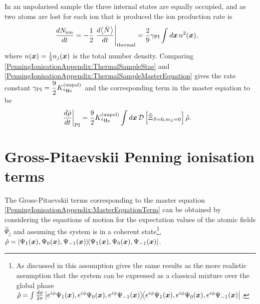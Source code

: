 In an unpolarised sample the three internal states are equally occupied, and as two atoms are lost for each ion that is produced the ion production rate is
\begin{align}
    \frac{d N_\text{ion}}{dt} &= -\frac{1}{2} \left.\frac{d \mean{\hat{N}}}{dt}\right|_\text{thermal} = \frac{2}{9} \gamma_\text{PI} \int d \vect{x}\, n^2(\vect{x}),
    \label{PenningIonisationAppendix:ThermalSampleMasterEquation}
\end{align}
where $n(\bm{x}) = \frac{1}{3}n_j(\bm{x})$ is the total number density.
Comparing \eqref{PenningIonisationAppendix:ThermalSampleStas} and \eqref{PenningIonisationAppendix:ThermalSampleMasterEquation}  gives the rate constant $\displaystyle\gamma_\text{PI} = \frac{9}{2} K^\text{(unpol)}_{^4\text{He}}$ and the corresponding term in the master equation to be
\begin{align}
    \label{PenningIonisationAppendix:MasterEquationTerm}
    \left.\frac{d \hat{\rho}}{dt}\right|_\text{PI} &= \frac{9}{2} \Kunpol \int d \vect{x}\, \mathcal{D}\left[ \hat{\Xi}_{S=0, m_S=0}\right] \hat{\rho}.
\end{align}

\section{Gross-Pitaevskii Penning ionisation terms}
\label{PenningIonisationAppendix:GP}

The Gross-Pitaevskii terms corresponding to the master equation \eqref{PenningIonisationAppendix:MasterEquationTerm} can be obtained by considering the equations of motion for the expectation values of the atomic fields $\hat{\Psi}_j$ and assuming the system is in a coherent state\footnote{As discussed in  this assumption gives the same results as the more realistic assumption that the system can be expressed as a classical mixture over the global phase $\hat{\rho} = \int \frac{d\phi}{2\pi} \left|e^{i\phi}\Psi_1(\bm{x}), e^{i\phi}\Psi_0(\bm{x}), e^{i\phi}\Psi_{-1}(\bm{x})\middle>\!\middle<e^{i\phi}\Psi_1(\bm{x}), e^{i\phi}\Psi_0(\bm{x}), e^{i\phi}\Psi_{-1}(\bm{x})\right|$.}, $\displaystyle\hat{\rho} =  \left|\Psi_1(\bm{x}), \Psi_0(\bm{x}), \Psi_{-1}(\bm{x})\middle>\!\middle<\Psi_1(\bm{x}), \Psi_0(\bm{x}), \Psi_{-1}(\bm{x})\right|$.

